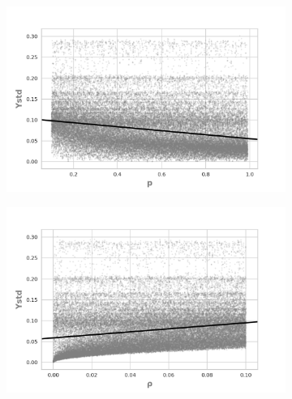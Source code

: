 \begin{figure}[H]
    \begin{subfigure}[b]{0.49\textwidth}
        \includegraphics[width=\textwidth]{ims/sigmaregression/sigmap.png}
      \end{subfigure}
          \begin{subfigure}[b]{0.49\textwidth}
            \includegraphics[width=\textwidth]{ims/sigmaregression/sigmarho.png}
      \end{subfigure}


\end{figure}
